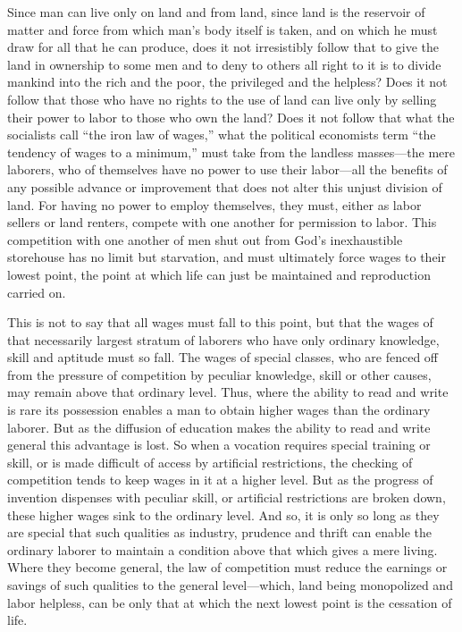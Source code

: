 \documentclass{book}
\begin{document}
Since man can live only on land and from land, since land is the reservoir of matter and force from which man’s body itself is taken, and on which he must draw for all that he can produce, does it not irresistibly follow that to give the land in ownership to some men and to deny to others all right to it is to divide mankind into the rich and the poor, the privileged and the helpless? Does it not follow that those who have no rights to the use of land can live only by selling their power to labor to those who own the land? Does it not follow that what the socialists call “the iron law of wages,” what the political economists term “the tendency of wages to a minimum,” must take from the landless masses—the mere laborers, who of themselves have no power to use their labor—all the benefits of any possible advance or improvement that does not alter this unjust division of land. For having no power to employ themselves, they must, either as labor sellers or land renters, compete with one another for permission to labor. This competition with one another of men shut out from God’s inexhaustible storehouse has no limit but starvation, and must ultimately force wages to their lowest point, the point at which life can just be maintained and reproduction carried on.

This is not to say that all wages must fall to this point, but that the wages of that necessarily largest stratum of laborers who have only ordinary knowledge, skill and aptitude must so fall. The wages of special classes, who are fenced off from the pressure of competition by peculiar knowledge, skill or other causes, may remain above that ordinary level. Thus, where the ability to read and write is rare its possession enables a man to obtain higher wages than the ordinary laborer. But as the diffusion of education makes the ability to read and write general this advantage is lost. So when a vocation requires special training or skill, or is made difficult of access by artificial restrictions, the checking of competition tends to keep wages in it at a higher level. But as the progress of invention dispenses with peculiar skill, or artificial restrictions are broken down, these higher wages sink to the ordinary level. And so, it is only so long as they are special that such qualities as industry, prudence and thrift can enable the ordinary laborer to maintain a condition above that which gives a mere living. Where they become general, the law of competition must reduce the earnings or savings of such qualities to the general level—which, land being monopolized and labor helpless, can be only that at which the next lowest point is the cessation of life.
\end{document}
